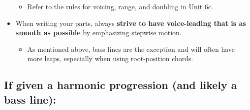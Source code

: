 \documentclass{book}
\providecommand{\tightlist}{%
  \setlength{\itemsep}{0pt}\setlength{\parskip}{0pt}}
\begin{document}
\begin{itemize}
  \begin{itemize}
  \tightlist
  \item
    Refer to the rules for voicing, range, and doubling in
    \href{06-intro-harmonic/c1-voiceleadingerrors.html}{Unit 6c}.
  \end{itemize}
\item
  When writing your parts, always \textbf{strive to have voice-leading that is
  as smooth as possible} by emphasizing stepwise motion.

  \begin{itemize}
  \tightlist
  \item
    As mentioned above, bass lines are the exception and will often have more
    leaps, especially when using root-position chords.
  \end{itemize}
\end{itemize}

\hypertarget{if-given-a-harmonic-progression-and-likely-a-bass-line}{%
\subsection{If given a harmonic progression (and likely a bass
line):}\label{if-given-a-harmonic-progression-and-likely-a-bass-line}}
\end{document}
